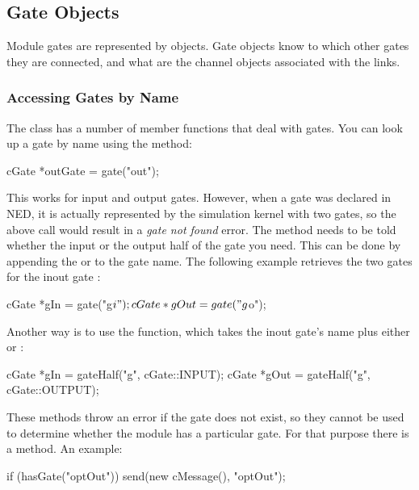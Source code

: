 \subsection{Gate Objects}

Module gates are represented by  objects.
Gate objects know to which other gates they are connected, and
what are the channel objects associated with the links.

\subsubsection{Accessing Gates by Name}

The  class has a number of member functions that
deal with gates. You can look up a gate by name using the 
method:

\begin{cpp}
cGate *outGate = gate("out");
\end{cpp}

This works for input and output gates. However, when a gate was declared
 in NED, it is actually represented by the simulation kernel
with two gates, so the above call would result in a \textit{gate not found}
error. The  method needs to be told whether the input or
the output half of the gate you need. This can be done by appending
the  or  to the gate name. The following example
retrieves the two gates for the inout gate :

\begin{cpp}
cGate *gIn = gate("g$i");
cGate *gOut = gate("g$o");
\end{cpp}

Another way is to use the  function, which takes
the inout gate's name plus either  or :

\begin{cpp}
cGate *gIn = gateHalf("g", cGate::INPUT);
cGate *gOut = gateHalf("g", cGate::OUTPUT);
\end{cpp}

These methods throw an error if the gate does not exist, so they cannot
be used to determine whether the module has a particular gate.
For that purpose there is a  method. An example:

\begin{cpp}
if (hasGate("optOut"))
   send(new cMessage(), "optOut");
\end{cpp}


